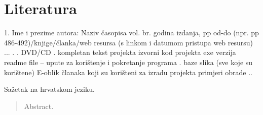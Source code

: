 \documentclass[times, utf8, diplomski]{fer}
\begin{document}
\chapter{Literatura}

1. Ime i prezime autora: Naziv časopisa vol. br. godina izdanja, pp od-do (npr. pp 486-492)/knjige/članka/web resursa (s linkom i datumom pristupa web resursu)
...
.
.
DVD/CD  
.
kompletan tekst projekta
izvorni kod projekta
exe verzija
readme file – upute za korištenje i pokretanje programa
.
baze slika (sve koje su korištene)
E-oblik članaka koji su korišteni za izradu projekta
primjeri obrade
..






\begin{sazetak}
Sažetak na hrvatskom jeziku.

\end{sazetak}

\begin{abstract}
Abstract.

\end{abstract}
\end{document}
